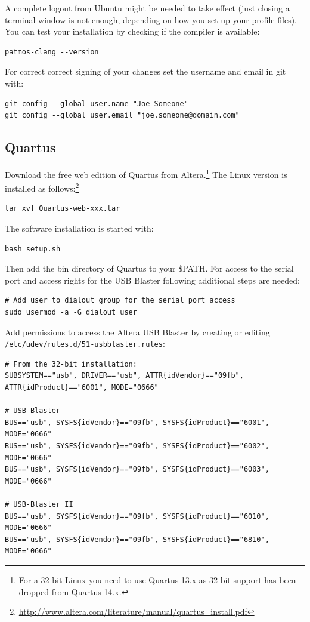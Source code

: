 \documentclass[a4paper,fontsize=10pt,twoside,DIV15,BCOR12mm,headinclude=true,footinclude=false,pagesize,bibtotoc]{scrbook}
\newcommand{\code}[1]{{\texttt{#1}}}
\begin{document}
A complete logout from Ubuntu might be needed to take effect (just closing
a terminal window is not enough, depending on how you set up your profile files).
You can test your installation by checking if the compiler is available:

\begin{verbatim}
patmos-clang --version
\end{verbatim}

For correct correct signing of your changes set the username and
email in git with:

\begin{verbatim}
git config --global user.name "Joe Someone"
git config --global user.email "joe.someone@domain.com"
\end{verbatim}

\subsection{Quartus}

Download the free web edition of Quartus from Altera.\footnote{For a 32-bit Linux you need to
use Quartus 13.x as 32-bit support has been dropped from Quartus 14.x.}
The Linux version is
installed as follows:\footnote{\url{http://www.altera.com/literature/manual/quartus_install.pdf}}

\begin{verbatim}
tar xvf Quartus-web-xxx.tar
\end{verbatim}

The software installation is started with:

\begin{verbatim}
bash setup.sh
\end{verbatim}

Then add the bin directory of Quartus to your \$PATH.
%
For access to the serial port and access rights for the USB Blaster following additional steps are needed:

\begin{verbatim}
# Add user to dialout group for the serial port access
sudo usermod -a -G dialout user
\end{verbatim}

Add permissions to access the Altera USB Blaster by creating or editing \code{/etc/udev/rules.d/51-usbblaster.rules}:

\begin{verbatim}
# From the 32-bit installation:
SUBSYSTEM=="usb", DRIVER=="usb", ATTR{idVendor}=="09fb", ATTR{idProduct}=="6001", MODE="0666"

# USB-Blaster
BUS=="usb", SYSFS{idVendor}=="09fb", SYSFS{idProduct}=="6001", MODE="0666"
BUS=="usb", SYSFS{idVendor}=="09fb", SYSFS{idProduct}=="6002", MODE="0666"
BUS=="usb", SYSFS{idVendor}=="09fb", SYSFS{idProduct}=="6003", MODE="0666"

# USB-Blaster II
BUS=="usb", SYSFS{idVendor}=="09fb", SYSFS{idProduct}=="6010", MODE="0666"
BUS=="usb", SYSFS{idVendor}=="09fb", SYSFS{idProduct}=="6810", MODE="0666"
\end{verbatim}
\end{document}
